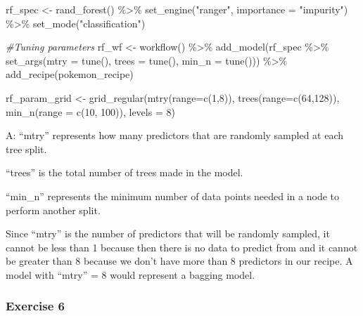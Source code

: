\documentclass[
]{article}
\newenvironment{Shaded}{\begin{snugshade}}{\end{snugshade}}
\newcommand{\AttributeTok}[1]{\textcolor[rgb]{0.77,0.63,0.00}{#1}}
\newcommand{\CommentTok}[1]{\textcolor[rgb]{0.56,0.35,0.01}{\textit{#1}}}
\newcommand{\DecValTok}[1]{\textcolor[rgb]{0.00,0.00,0.81}{#1}}
\newcommand{\FunctionTok}[1]{\textcolor[rgb]{0.00,0.00,0.00}{#1}}
\newcommand{\NormalTok}[1]{#1}
\newcommand{\OtherTok}[1]{\textcolor[rgb]{0.56,0.35,0.01}{#1}}
\newcommand{\SpecialCharTok}[1]{\textcolor[rgb]{0.00,0.00,0.00}{#1}}
\newcommand{\StringTok}[1]{\textcolor[rgb]{0.31,0.60,0.02}{#1}}
\begin{document}
\begin{Shaded}
\begin{Highlighting}[]
\NormalTok{rf\_spec }\OtherTok{\textless{}{-}} \FunctionTok{rand\_forest}\NormalTok{() }\SpecialCharTok{\%\textgreater{}\%}
  \FunctionTok{set\_engine}\NormalTok{(}\StringTok{"ranger"}\NormalTok{, }\AttributeTok{importance =} \StringTok{"impurity"}\NormalTok{) }\SpecialCharTok{\%\textgreater{}\%}
  \FunctionTok{set\_mode}\NormalTok{(}\StringTok{"classification"}\NormalTok{)}

\CommentTok{\#Tuning parameters}
\NormalTok{rf\_wf }\OtherTok{\textless{}{-}} \FunctionTok{workflow}\NormalTok{() }\SpecialCharTok{\%\textgreater{}\%}
  \FunctionTok{add\_model}\NormalTok{(rf\_spec }\SpecialCharTok{\%\textgreater{}\%} \FunctionTok{set\_args}\NormalTok{(}\AttributeTok{mtry =} \FunctionTok{tune}\NormalTok{(), }\AttributeTok{trees =} \FunctionTok{tune}\NormalTok{(), }\AttributeTok{min\_n =} \FunctionTok{tune}\NormalTok{())) }\SpecialCharTok{\%\textgreater{}\%}
  \FunctionTok{add\_recipe}\NormalTok{(pokemon\_recipe)}

\NormalTok{rf\_param\_grid }\OtherTok{\textless{}{-}} \FunctionTok{grid\_regular}\NormalTok{(}\FunctionTok{mtry}\NormalTok{(}\AttributeTok{range=}\FunctionTok{c}\NormalTok{(}\DecValTok{1}\NormalTok{,}\DecValTok{8}\NormalTok{)), }\FunctionTok{trees}\NormalTok{(}\AttributeTok{range=}\FunctionTok{c}\NormalTok{(}\DecValTok{64}\NormalTok{,}\DecValTok{128}\NormalTok{)), }\FunctionTok{min\_n}\NormalTok{(}\AttributeTok{range =} \FunctionTok{c}\NormalTok{(}\DecValTok{10}\NormalTok{, }\DecValTok{100}\NormalTok{)), }\AttributeTok{levels =} \DecValTok{8}\NormalTok{)}
\end{Highlighting}
\end{Shaded}

A: ``mtry'' represents how many predictors that are randomly sampled at
each tree split.

``trees'' is the total number of trees made in the model.

``min\_n'' represents the minimum number of data points needed in a node
to perform another split.

Since ``mtry'' is the number of predictors that will be randomly
sampled, it cannot be less than 1 because then there is no data to
predict from and it cannot be greater than 8 because we don't have more
than 8 predictors in our recipe. A model with ``mtry'' = 8 would
represent a bagging model.

\hypertarget{exercise-6}{%
\subsubsection{Exercise 6}\label{exercise-6}}
\end{document}
